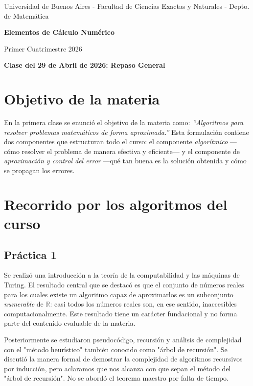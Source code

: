 \documentclass[12pt]{article}
\newcommand{\R}{\mathbb{R}}
\begin{document}
\centerline{{\small Universidad de Buenos Aires - Facultad de Ciencias Exactas y Naturales - Depto. de Matemática}}

\vskip 0.2cm
\hrulefill
\vskip 0.2cm

\centerline{{\bf\Huge {\sc Elementos de Cálculo Numérico}}}
\vskip 0.2cm
\centerline{\ttfamily Primer Cuatrimestre 2026}
\hrulefill

\bigskip
\centerline{\bf Clase del 29 de Abril de 2026: Repaso General}
\bigskip

\section*{Objetivo de la materia}

En la primera clase se enunció el objetivo de la materia como: \textit{``Algoritmos para resolver problemas matemáticos de forma aproximada.''}  Esta formulación contiene dos componentes que estructuran todo el curso: el componente \emph{algorítmico} ---cómo resolver el problema de manera efectiva y eficiente--- y el componente de \emph{aproximación y control del error} ---qué tan buena es la solución obtenida y cómo se propagan los errores.

\section*{Recorrido por los algoritmos del curso}

\subsection*{Práctica 1}

Se realizó una introducción a la teoría de la computabilidad y las máquinas de Turing. El resultado central que se destacó es que el conjunto de números reales para los cuales existe un algoritmo capaz de aproximarlos es un subconjunto \emph{numerable} de $\R$: casi todos los números reales son, en ese sentido, inaccesibles computacionalmente. Este resultado tiene un carácter fundacional y no forma parte del contenido evaluable de la materia.

Posteriormente se estudiaron pseudocódigo, recursión y análisis de complejidad con el "método heurístico" también conocido como "árbol de recursión". Se discutió la manera formal de demostrar la complejidad de algoritmos recursivos por inducción, pero aclaramos que nos alcanza con que sepan el método del "árbol de recursión". No se abordó el teorema maestro por falta de tiempo.
\end{document}
